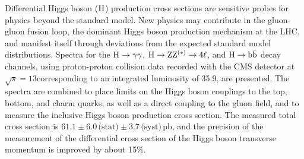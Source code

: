 Differential Higgs boson ($\mathrm{H}$) production cross sections are sensitive probes for physics beyond the standard model.
% 
New physics may contribute in the gluon-gluon fusion loop, the dominant Higgs boson production mechanism at the LHC, and manifest itself through deviations from the expected standard model distributions.
% 
% 
Spectra for the $\mathrm{H}\to\mathrm{\gamma}\mathrm{\gamma}$, $\mathrm{H}\to\mathrm{Z}\mathrm{Z}^{(\ast)}\to 4\ell$, and $\mathrm{H}\to\mathrm{b}\bar{\mathrm{b}}$ decay channels, using proton-proton collision data recorded with the CMS detector at $\sqrt{s}=13$\TeV corresponding to an integrated luminosity of 35.9\fbinv, are presented.
% 
The spectra are combined to place limits on the Higgs boson couplings to the top, bottom, and charm quarks, as well as a direct coupling to the gluon field, and to measure the inclusive Higgs boson production cross section.
% 
The measured total cross section is $61.1   \pm 6.0 \,\text{(stat)}   \pm 3.7 \,\text{(syst)} \,$pb, and the precision of the measurement of the differential cross section of the Higgs boson transverse momentum is improved by about 15\%.